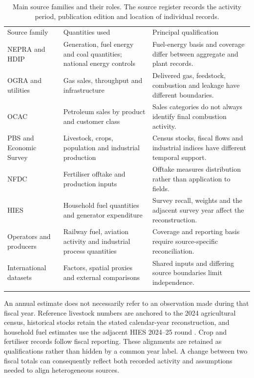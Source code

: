 \documentclass[essd]{copernicus}
\begin{document}
\begin{table}[t]
\caption{Main source families and their roles. The source register records the activity period, publication edition and location of individual records.}
\label{tab:sources}
\small
\begin{tabular}{p{}p{}p{}}
\tophline
Source family & Quantities used & Principal qualification \\
\middlehline
NEPRA and HDIP & Generation, fuel energy and coal quantities; national energy controls & Fuel-energy basis and coverage differ between aggregate and plant records. \\
OGRA and utilities & Gas sales, throughput and infrastructure & Delivered gas, feedstock, combustion and leakage have different boundaries. \\
OCAC & Petroleum sales by product and customer class & Sales categories do not always identify final combustion activity. \\
PBS and Economic Survey & Livestock, crops, population and industrial production & Census stocks, fiscal flows and industrial indices have different temporal support. \\
NFDC & Fertiliser offtake and production inputs & Offtake measures distribution rather than application to fields. \\
HIES & Household fuel quantities and generator expenditure & Survey recall, weights and the adjacent survey year affect the reconstruction. \\
Operators and producers & Railway fuel, aviation activity and industrial process quantities & Coverage and reporting basis require source-specific reconciliation. \\
International datasets & Factors, spatial proxies and external comparisons & Shared inputs and differing source boundaries limit independence. \\
\bottomhline
\end{tabular}
\end{table}

An annual estimate does not necessarily refer to an observation made during that fiscal year. Reference livestock numbers are anchored to the 2024 agricultural census, historical stocks retain the stated calendar-year reconstruction, and household fuel estimates use the adjacent HIES 2024--25 round \citep{PBSAgri2026,PBSHIES2026}. Crop and fertiliser records follow fiscal reporting. These alignments are retained as qualifications rather than hidden by a common year label. A change between two fiscal totals can consequently reflect both recorded activity and assumptions needed to align heterogeneous sources.
\end{document}
